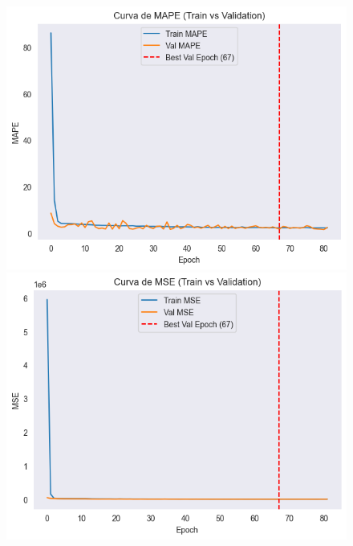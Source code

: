 \begin{figure}[H]
\begin{minipage}{0.48\textwidth}
		\vspace{0.2cm}
		\includegraphics[width=\linewidth]{includes/cap5/graphs/sid1_mlp_mape.png}
	\end{minipage}
	\hfill
	\begin{minipage}{0.48\textwidth}
		\centering
		\includegraphics[width=\linewidth]{includes/cap5/graphs/sid1_mlp_mse.png}
		\vspace{0.2cm}

\end{minipage}
\end{figure}
